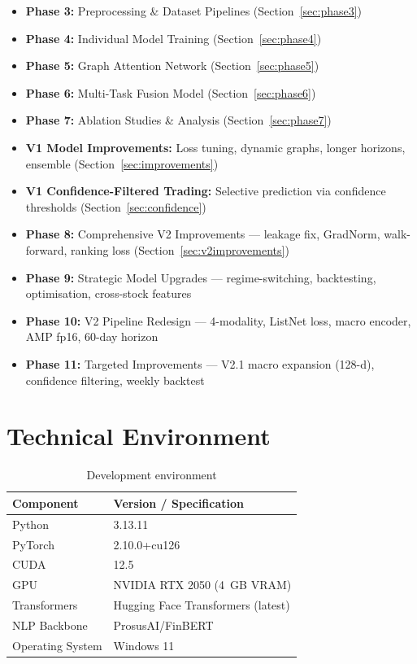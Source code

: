 \documentclass[12pt,a4paper]{article}
\begin{document}
\begin{itemize}[noitemsep,topsep=0pt,leftmargin=*]
    \item \textbf{Phase 3:} Preprocessing \& Dataset Pipelines (Section~\ref{sec:phase3})
    \item \textbf{Phase 4:} Individual Model Training (Section~\ref{sec:phase4})
    \item \textbf{Phase 5:} Graph Attention Network (Section~\ref{sec:phase5})
    \item \textbf{Phase 6:} Multi-Task Fusion Model (Section~\ref{sec:phase6})
    \item \textbf{Phase 7:} Ablation Studies \& Analysis (Section~\ref{sec:phase7})
    \item \textbf{V1 Model Improvements:} Loss tuning, dynamic graphs, longer horizons, ensemble (Section~\ref{sec:improvements})
    \item \textbf{V1 Confidence-Filtered Trading:} Selective prediction via confidence thresholds (Section~\ref{sec:confidence})
    \item \textbf{Phase 8:} Comprehensive V2 Improvements --- leakage fix, GradNorm, walk-forward, ranking loss (Section~\ref{sec:v2improvements})
    \item \textbf{Phase 9:} Strategic Model Upgrades --- regime-switching, backtesting, optimisation, cross-stock features
    \item \textbf{Phase 10:} V2 Pipeline Redesign --- 4-modality, ListNet loss, macro encoder, AMP fp16, 60-day horizon
    \item \textbf{Phase 11:} Targeted Improvements --- V2.1 macro expansion (128-d), confidence filtering, weekly backtest
\end{itemize}

\newpage
\tableofcontents
\newpage

\section{Technical Environment}
\label{sec:environment}

\begin{table}[H]
\centering
\begin{tabular}{ll}
\toprule
\textbf{Component} & \textbf{Version / Specification} \\
\midrule
Python & 3.13.11 \\
PyTorch & 2.10.0+cu126 \\
CUDA & 12.5 \\
GPU & NVIDIA RTX 2050 (4~GB VRAM) \\
Transformers & Hugging Face Transformers (latest) \\
NLP Backbone & ProsusAI/FinBERT \\
Operating System & Windows 11 \\
\bottomrule
\end{tabular}
\caption{Development environment}
\label{tab:environment}
\end{table}
\end{document}
